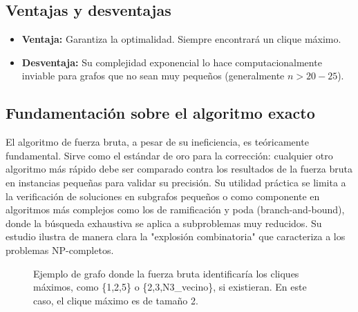 \documentclass[12pt,a4paper]{report}
\begin{document}
\subsection{Ventajas y desventajas}
\begin{itemize}
    \item \textbf{Ventaja:} Garantiza la optimalidad. Siempre encontrará un clique máximo.
    \item \textbf{Desventaja:} Su complejidad exponencial lo hace computacionalmente inviable para grafos que no sean muy pequeños (generalmente $n > 20-25$).
\end{itemize}

\subsection{Fundamentación sobre el algoritmo exacto}
El algoritmo de fuerza bruta, a pesar de su ineficiencia, es teóricamente fundamental. Sirve como el estándar de oro para la corrección: cualquier otro algoritmo más rápido debe ser comparado contra los resultados de la fuerza bruta en instancias pequeñas para validar su precisión. Su utilidad práctica se limita a la verificación de soluciones en subgrafos pequeños o como componente en algoritmos más complejos como los de ramificación y poda (branch-and-bound), donde la búsqueda exhaustiva se aplica a subproblemas muy reducidos. Su estudio ilustra de manera clara la "explosión combinatoria" que caracteriza a los problemas NP-completos.

\begin{figure}[H]
    \centering
    \caption{Ejemplo de grafo donde la fuerza bruta identificaría los cliques máximos, como \{1,2,5\} o \{2,3,N3\_vecino\}, si existieran. En este caso, el clique máximo es de tamaño 2.}
    \label{fig:grafo_ejemplo_bf}
\end{figure}
\end{document}
